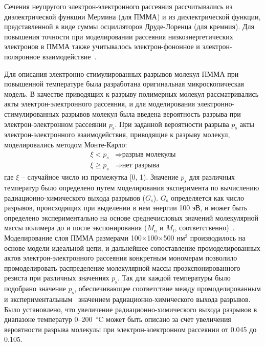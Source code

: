 Сечения неупругого электрон-электронного рассеяния рассчитывались из диэлектрической функции Мермина (для ПММА) и из диэлектрической функции, представленной в виде суммы осцилляторов Друде-Лоренца (для кремния). Для повышения точности при моделировании рассеяния низкоэнергетических электронов в ПММА также учитывалось электрон-фононное и электрон-поляронное взаимодействие~\cite{Ciappa_2010}.

Для описания электронно-стимулированных разрывов молекул ПММА при повышенной температуре была разработана оригинальная микроскопическая модель. В качестве приводящих к разрыву полимерных молекул рассматривались акты электрон-электронного рассеяния, и для моделирования электронно-стимулированных разрывов молекул была введена вероятность разрыва при электрон-электронном рассеянии $p_\mathrm{s}$. При заданной вероятности разрыва $p_\mathrm{s}$ акты электрон-электронного взаимодействия, приводящие к разрыву молекул, моделировались методом Монте-Карло:
\begin{equation} \label{eq:MC_9}
	\begin{aligned}
		\xi < p_s & \Rightarrow \text{разрыв молекулы} \\
		\xi \geq p_s & \Rightarrow \text{нет разрыва}
	\end{aligned}
\end{equation}
где $\xi$ -- случайное число из промежутка [0, 1). Значение $p_\mathrm{s}$ для различных температур было определено путем моделирования эксперимента по вычислению радиационно-химического выхода разрывов ($G_\mathrm{s}$). $G_\mathrm{s}$ определяется как число разрывов,  происходящих при выделении в нем энергии 100 эВ, и может быть определено экспериментально на основе среднечисловых значений молекулярной массы полимера до и после экспонирования ($M_\mathrm{n}$ и $M_\mathrm{f}$, соответственно)~\cite{Greeneich1979_Mf_Mn}. Моделирование слоя ПММА размерами 100$\times$100$\times$500 нм$^{\text{3}}$ производилось на основе модели идеальной цепи, и дальнейшее сопоставление промоделированных актов электрон-электронного рассеяния конкретным мономерам позволило промоделировать распределение молекулярной массы проэкспонированного резиста при различных значениях $p_\mathrm{s}$. Так для каждой температуры было подобрано значение $p_\mathrm{s}$, обеспечивающее соответствие между промоделированным и экспериментальным~\cite{Charlesby_1964_Gs} значением радиационно-химического выхода разрывов. Было установлено, что увеличение радиационно-химического выхода разрывов в диапазоне температур 0--200~$^\circ$C может быть описано за счет увеличения вероятности разрыва молекулы при электрон-электронном рассеянии от 0.045 до 0.105.

